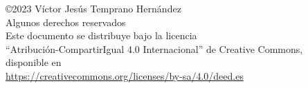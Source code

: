 \documentclass[a4paper, 11pt]{book}
\begin{document}
%
%
%
%
%
%
%
%
%
%
%
%
%
%

\vfill
\begin{flushright}
\begin{minipage}{0.65\textwidth}
{\footnotesize 
\noindent©2023 Víctor Jesús Temprano Hernández\\ 
Algunos derechos reservados\\
Este documento se distribuye bajo la licencia\\
“Atribución-CompartirIgual 4.0 Internacional” de Creative Commons,\\
disponible en  \\
\url{https://creativecommons.org/licenses/by-sa/4.0/deed.es}
}

\end{minipage}
\end{flushright}
\end{document}
